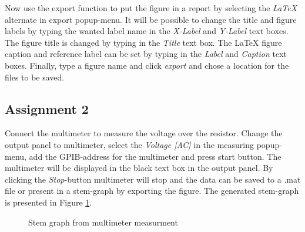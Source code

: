 Now use the export function to put the figure in a report by selecting the \emph{LaTeX} alternate in export popup-menu. It will be possible to change the title and figure labels by typing the wanted label name in the \emph{X-Label} and \emph{Y-Label} text boxes. The figure title is changed by typing in the \emph{Title} text box. The LaTeX figure caption and reference label can be set by typing in the \emph{Label} and \emph{Caption} text boxes. Finally, type a figure name and click \emph{export} and chose a location for the files to be saved.

\subsection{Assignment 2}
Connect the multimeter to measure the voltage over the resistor. Change the output panel to multimeter, select the \emph{Voltage [AC]} in the measuring popup-menu, add the GPIB-address for the multimeter and press start button. The multimeter will be displayed in the black text box in the output panel. By clicking the \emph{Stop}-button multimeter will stop and the data can be saved to a .mat file or present in a stem-graph by exporting the figure. The generated stem-graph is presented in Figure \ref{stem}.
	\begin{figure}[H]
	\centering
		\caption{Stem graph from multimeter measurment}
		\label{stem}
	\end{figure}

